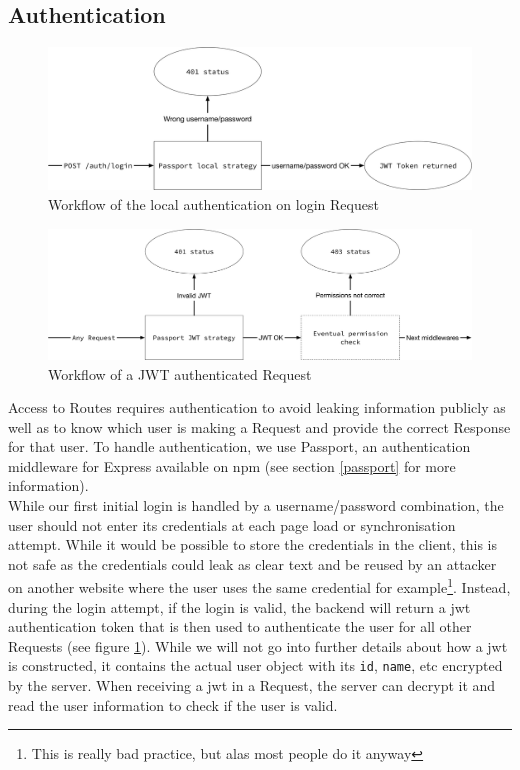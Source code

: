 \documentclass[twoside, openright,11pt,a4paper]{book}
\begin{document}
\subsection{Authentication}
\label{implementation_auth}
\begin{figure}[H]
\begin{center}
	\includegraphics[width=\textwidth]{assets/login_workflow}
	\caption{Workflow of the local authentication on login Request}
	\label{login_workflow}
\end{center}
\end{figure}
\begin{figure}[H]
\begin{center}
	\includegraphics[width=\textwidth]{assets/request_workflow}
	\caption{Workflow of a JWT authenticated Request}
		\label{jwt_workflow}
\end{center}
\end{figure}
Access to Routes requires authentication to avoid leaking information publicly as well as to know which user is making a Request and provide the correct Response for that user. To handle authentication, we use Passport, an authentication middleware for Express available on \gls{npm} (see section \ref{passport} for more information). \\

While our first initial login is handled by a username/password combination, the user should not enter its credentials at each page load or synchronisation attempt. While it would be possible to store the credentials in the client, this is not safe as the credentials could leak as clear text and be reused by an attacker on another website where the user uses the same credential for example\footnote{This is really bad practice, but alas most people do it anyway}. Instead, during the login attempt, if the login is valid, the backend will return a \gls{jwt} authentication token that is then used to authenticate the user for all other Requests (see figure \ref{login_workflow}). While we will not go into further details about how a  \gls{jwt} is constructed, it contains the actual user object with its \verb+id+, \verb+name+, etc encrypted by the server. When receiving a \gls{jwt} in a Request, the server can decrypt it and read the user information to check if the user is valid.\\
\end{document}
